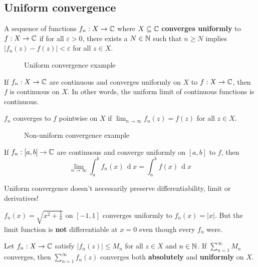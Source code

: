 \documentclass[12pt]{article}
\renewcommand{\d}{\ensuremath{\operatorname{d}}}
\begin{document}
\subsection{Uniform convergence}
 A sequence of functions $f_n: X\to \mathbb{C}$ where $X\subseteq \mathbb{C}$ \textbf{converges uniformly} to $f:X\to \mathbb{C}$ if for all $\varepsilon>0$, there exists a $N\in \mathbb{N}$ such that $n\geq N$ implies $|f_n(z)-f(z)|<\varepsilon$ for all $z\in X$.
\begin{figure}[htbp]
    \centering
    
    \caption{Uniform convergence example}
\end{figure}

\begin{theorem}
    If $f_n: X\to \mathbb{C}$ are continuous and converges uniformly on $X$ to $f:X\to\mathbb{C}$, then $f$ is continuous on $X$.
    In other words, the uniform limit of continuous functions is continuous.
\end{theorem}

\rmk $f_n$ converges to $f$ pointwise on $X$ if $\lim_{n\to \infty}f_n(z)=f(z)$ for all $z\in X$.
\begin{figure}[htbp]
    \centering
    
    \caption{Non-uniform convergence example}
\end{figure}

\begin{theorem}
    If $f_n:[a,b]\to \mathbb{C}$ are continuous and converge uniformly on $[a,b]$ to $f$, then $$
    \lim_{n\to \infty}\int_{a}^{b}f_n(x)\,\d x = \int_{a}^{b}f(x)\,\d x
    $$
\end{theorem}

\rmk Uniform convergence doesn't necessarily preserve differentiability, limit or derivatives!

\eg $f_n(x)=\sqrt{x^2+\frac{1}{n}}$ on $[-1,1]$ converges uniformly to $f_n(x)=|x|$. But the limit function is \textbf{not} differentiable at $x=0$ even though every $f_n$ were.


\begin{theorem} 
    Let $f_n:X\to \mathbb{C}$ satisfy $|f_n(z)|\leq M_n$ for all $z\in X$ and $n\in \mathbb{N}$. If $\sum_{n=1}^{\infty}M_n$ converges, then $\sum_{n=1}^{\infty}f_n(z)$ converges both \textbf{absolutely} and \textbf{uniformly} on $X$.
\end{theorem}
\end{document}
